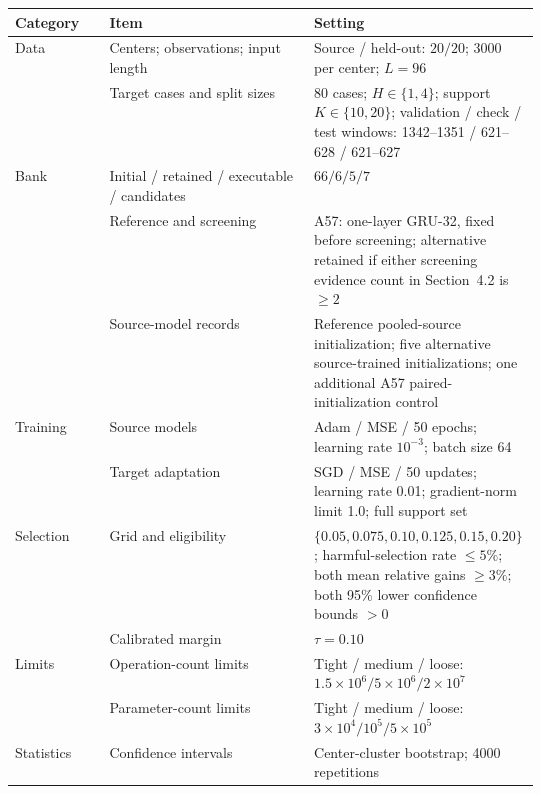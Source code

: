 \begin{center}
\begin{minipage}{\linewidth}
\label{tab:configuration}
\centering
\scriptsize
\renewcommand{\arraystretch}{1.05}
\setlength{\tabcolsep}{2.5pt}
\begin{tabularx}{\linewidth}{Z{0.18\linewidth} Y Z{0.43\linewidth}}
\toprule
Category & Item & Setting \\
\midrule
Data
& Centers; observations; input length
& Source / held-out: $20/20$; 3000 per center; $L=96$ \\
& Target cases and split sizes
& 80 cases; $H\in\{1,4\}$; support $K\in\{10,20\}$;
validation / check / test windows: 1342--1351 / 621--628 / 621--627 \\
\midrule
Bank
& Initial / retained / executable / candidates
& $66/6/5/7$ \\
& Reference and screening
& A57: one-layer GRU-32, fixed before screening; alternative retained if
either screening evidence count in Section~4.2 is $\geq 2$ \\
& Source-model records
& Reference pooled-source initialization; five alternative source-trained
initializations; one additional A57 paired-initialization control \\
\midrule
Training
& Source models
& Adam / MSE / 50 epochs; learning rate $10^{-3}$; batch size 64 \\
& Target adaptation
& SGD / MSE / 50 updates; learning rate 0.01; gradient-norm limit 1.0;
full support set \\
\midrule
Selection
& Grid and eligibility
& $\{0.05,0.075,0.10,0.125,0.15,0.20\}$;
harmful-selection rate $\leq5\%$; both mean relative gains $\geq3\%$;
both 95\% lower confidence bounds $>0$ \\
& Calibrated margin
& $\tau=0.10$ \\
\midrule
Limits
& Operation-count limits
& Tight / medium / loose:
$1.5{\times}10^6/5{\times}10^6/2{\times}10^7$ \\
& Parameter-count limits
& Tight / medium / loose:
$3{\times}10^4/10^5/5{\times}10^5$ \\
\midrule
Statistics
& Confidence intervals
& Center-cluster bootstrap; 4000 repetitions \\
\bottomrule
\end{tabularx}
\end{minipage}
\end{center}
